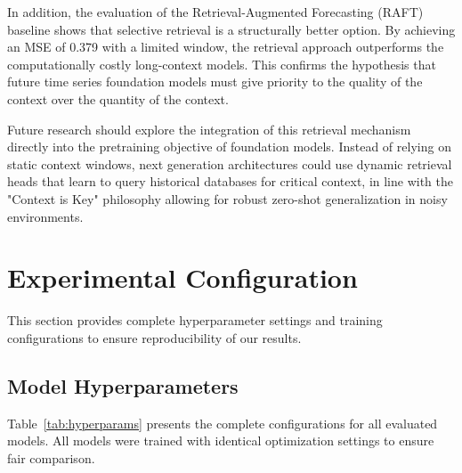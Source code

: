 \documentclass{article} %
\begin{document}
In addition, the evaluation of the Retrieval-Augmented Forecasting (RAFT) \citep{han2025raft} baseline shows that selective retrieval is a structurally better option. By achieving an MSE of 0.379 with a limited window, the retrieval approach outperforms the computationally costly long-context models. This confirms the hypothesis that future time series foundation models must give priority to the quality of the context over the quantity of the context.

Future research should explore the integration of this retrieval mechanism directly into the pretraining objective of foundation models. Instead of relying on static context windows, next generation architectures could use dynamic retrieval heads that learn to query historical databases for critical context, in line with the "Context is Key" philosophy \citep{williams2024context} allowing for robust zero-shot generalization in noisy environments.




\appendix

\section{Experimental Configuration}

This section provides complete hyperparameter settings and training configurations to ensure reproducibility of our results.

\subsection{Model Hyperparameters}

Table~\ref{tab:hyperparams} presents the complete configurations for all evaluated models. All models were trained with identical optimization settings to ensure fair comparison.
\end{document}
